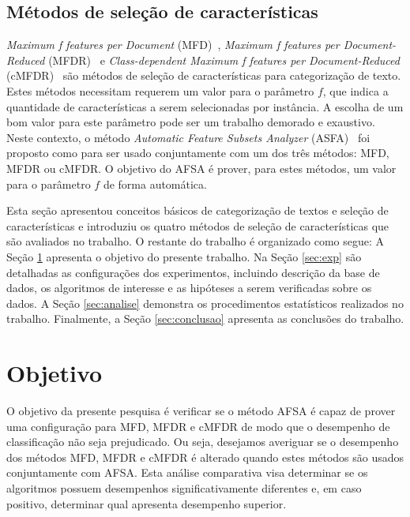 \documentclass[conference]{IEEEtran}
\begin{document}
\subsection{Métodos de seleção de características}
\label{sec:metodos}

\textit{Maximum f features per Document} (MFD)~\cite{mfd2014}, \textit{Maximum f features per Document-Reduced} (MFDR)~\cite{mfd2014} e \textit{Class-dependent Maximum f features per Document-Reduced} (cMFDR)~\cite{fragoso2016cmfdr} são métodos de seleção de características para categorização de texto. Estes métodos necessitam requerem um valor para o parâmetro $f$, que indica a quantidade de características a serem selecionadas por instância. A escolha de um bom valor para este parâmetro pode ser um trabalho demorado e exaustivo. Neste contexto, o método \textit{Automatic Feature Subsets Analyzer} (ASFA)~\cite{fragoso2016afsa} foi proposto como para ser usado conjuntamente com um dos três métodos: MFD, MFDR ou cMFDR. O objetivo do AFSA é prover, para estes métodos, um valor para o parâmetro $f$ de forma automática.

Esta seção apresentou conceitos básicos de categorização de textos e seleção de características e introduziu os quatro métodos de seleção de características que são avaliados no trabalho. 
O restante do trabalho é organizado como segue: 
A Seção \ref{sec:objetivo} apresenta o objetivo do presente trabalho. 
Na Seção \ref{sec:exp} são detalhadas as configurações dos experimentos, incluindo descrição da base de dados, os algoritmos de interesse e as hipóteses a serem verificadas sobre os dados. 
A Seção \ref{sec:analise} demonstra os procedimentos estatísticos realizados no trabalho.
Finalmente, a Seção \ref{sec:conclusao} apresenta as conclusões do trabalho.

\section{Objetivo}
\label{sec:objetivo}

O objetivo da presente pesquisa é verificar se o método AFSA é capaz de prover uma configuração para MFD, MFDR e cMFDR de modo que o desempenho de classificação não seja prejudicado. Ou seja, desejamos averiguar se o desempenho dos métodos MFD, MFDR e cMFDR é alterado quando estes métodos são usados conjuntamente com AFSA.
Esta análise comparativa visa determinar se os algoritmos possuem desempenhos significativamente diferentes e, em caso positivo, determinar qual apresenta desempenho superior.
\end{document}

